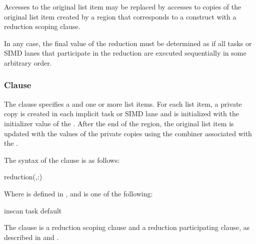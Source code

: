 Accesses to the original list item may be replaced by accesses to copies of the
original list item created by a region that corresponds to a construct with a
reduction scoping clause.

In any case, the final value of the reduction must be determined as if all tasks
or SIMD lanes that participate in the reduction are executed sequentially in
some arbitrary order.



\subsubsection{ Clause}
\label{subsubsec:reduction clause}
\summary
The  clause specifies a  and one or
more list items. For each list item, a private copy is created in each implicit
task or SIMD lane and is initialized with the initializer value of the
. After the end of the region, the original list item
is updated with the values of the private copies using the combiner associated
with the .

\syntax
The syntax of the  clause is as follows:

\begin{ompSyntax}
reduction(\plc{[ reduction-modifier},\plc{]reduction-identifier }:)
\end{ompSyntax}

Where  is defined in 
, and
 is one of the following:
\begin{indentedcodelist}
inscan
task
default
\end{indentedcodelist}

\descr
The  clause is a reduction scoping clause and a reduction
participating clause, as described in  
and . 

